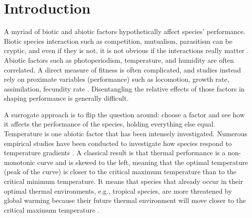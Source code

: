 \section*{Introduction}
A myriad of biotic and abiotic factors  hypothetically affect species' performance.
Biotic species interaction such as competition, mutualism, parasitism can be cryptic, and even if they is not, it is not obvious if the interactions really matter \citep{Morales2015}. 
Abiotic factors such as photoperiodism, temperature, and humidity are often correlated. 
A direct measure of fitness is often complicated, and studies instead rely on proximate variables (performance) such as locomotion, growth rate, assimilation, fecundity rate \citep[][and references therein]{Angilletta2009}.
Disentangling the relative effects of those factors in shaping performance is generally difficult.
 
A surrogate approach is to flip the question around: choose a factor and see how it affects the performance of the species, holding everything else equal.
Temperature is one abiotic factor that has been intensely investigated.
Numerous empirical studies have been conducted to investigate how species respond to temperature gradients \citep[e.g.,][]{Angilletta2009}.
A classical result is that thermal performance is a non-monotonic curve and is skewed to the left, meaning that the optimal temperature (peak of the curve) is closer to the critical maximum temperature than to the critical minimum temperature. 
It means that species that already occur in their optimal thermal environments, e.g., tropical species,  are more threatened by global warming because their future thermal environment will move closer to the critical maximum temperature \citep{Deutsch2008}. %

